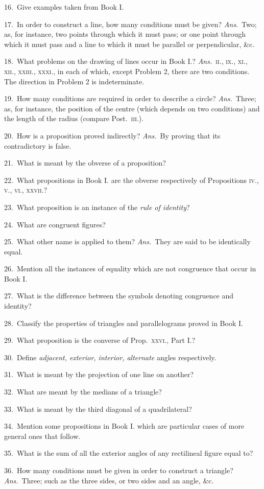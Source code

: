 \documentclass[oneside]{book}
\begin{document}
\begin{footnotesize}
16.~Give examples taken from Book I.


17.~In order to construct a line, how many conditions must be
given? \textit{Ans}.\ Two; as, for instance, two points through which
it must pass; or one point through which it must pass and a line
to which it must be parallel or perpendicular, \&c.

18.~What problems on the drawing of lines occur in Book I.?
\textit{Ans.}\ \textsc{ii., ix., xi., xii., xxiii., xxxi.,} in each of which, except
Problem 2, there are two conditions. The direction in
Problem 2 is indeterminate.

19.~How many conditions are required in order to describe a
circle? \textit{Ans.}\ Three; as, for instance, the position of the centre
(which depends on two conditions) and the length of the radius
(compare Post.\ \textsc{iii.}).

20.~How is a proposition proved indirectly? \textit{Ans.}\ By proving
that its contradictory is false.

21.~What is meant by the obverse of a proposition?

22.~What propositions in Book I. are the obverse respectively
of Propositions \textsc{iv., v., vi., xxvii.}?

23.~What proposition is an instance of the \textit{rule of identity}?

24.~What are congruent figures?

25.~What other name is applied to them? \textit{Ans.}\ They are
said to be identically equal.

26.~Mention all the instances of equality which are not
congruence that occur in Book I.

27.~What is the difference between the symbols denoting
congruence and identity?

28.~Classify the properties of triangles and parallelograms
proved in Book I.

29.~What proposition is the converse of Prop.\ \textsc{xxvi.}, Part I.?

30.~Define \textit{adjacent, exterior, interior, alternate} angles
respectively.

31.~What is meant by the projection of one line on another?

32.~What are meant by the medians of a triangle?

33.~What is meant by the third diagonal of a quadrilateral?

34.~Mention some propositions in Book I. which are particular
cases of more general ones that follow.

35.~What is the sum of all the exterior angles of any
rectilineal figure equal to?

36.~How many conditions must be given in order to construct
a triangle? \textit{Ans.}\ Three; such as the three sides, or two sides
and an angle, \&c.
\par\end{footnotesize}
\end{document}
